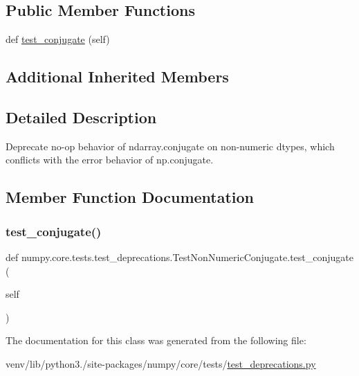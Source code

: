 \subsection*{Public Member Functions}
\begin{DoxyCompactItemize}
\item 
def \hyperlink{classnumpy_1_1core_1_1tests_1_1test__deprecations_1_1TestNonNumericConjugate_ae4604bd525efb25b15c56a3e98b57b47}{test\+\_\+conjugate} (self)
\end{DoxyCompactItemize}
\subsection*{Additional Inherited Members}


\subsection{Detailed Description}
\begin{DoxyVerb}Deprecate no-op behavior of ndarray.conjugate on non-numeric dtypes,
which conflicts with the error behavior of np.conjugate.
\end{DoxyVerb}
 

\subsection{Member Function Documentation}
\mbox{\label{classnumpy_1_1core_1_1tests_1_1test__deprecations_1_1TestNonNumericConjugate_ae4604bd525efb25b15c56a3e98b57b47}} 
\subsubsection{\texorpdfstring{test\+\_\+conjugate()}{test\_conjugate()}}
{\footnotesize\ttfamily def numpy.\+core.\+tests.\+test\+\_\+deprecations.\+Test\+Non\+Numeric\+Conjugate.\+test\+\_\+conjugate (\begin{DoxyParamCaption}\item[{}]{self }\end{DoxyParamCaption})}



The documentation for this class was generated from the following file\+:\begin{DoxyCompactItemize}
\item 
venv/lib/python3./site-\/packages/numpy/core/tests/\hyperlink{core_2tests_2test__deprecations_8py}{test\+\_\+deprecations.\+py}\end{DoxyCompactItemize}
